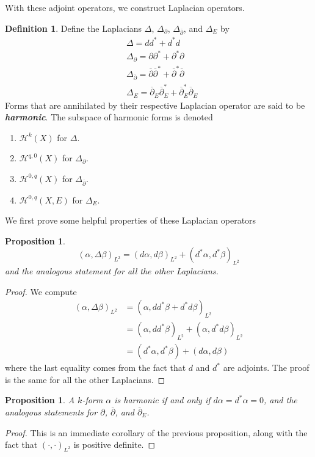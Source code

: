 \documentclass[psamsfonts, 12pt]{amsart}
\newtheorem{prop}[thm]{Proposition}
\theoremstyle{definition}
\newtheorem{defn}[thm]{Definition}
\theoremstyle{remark}
\newcommand{\ib}[1]{\textbf{\textit{#1}}}
\newcommand{\dbar}{\overline{\partial}}
\begin{document}
With these adjoint operators, we construct Laplacian operators.
%
\begin{defn}
Define the Laplacians $\Delta$, $\Delta_\partial$, $\Delta_{\dbar}$, and
$\Delta_E$ by
\begin{align*}
&\Delta = dd^* + d^*d \\
&\Delta_\partial = \partial\partial^* + \partial^*\partial \\
&\Delta_{\dbar} = \dbar\dbar^* + \dbar^*\dbar \\
&\Delta_E = \dbar_E\dbar_E^* + \dbar_E^*\dbar_E
\end{align*}
Forms that are annihilated by their respective Laplacian operator are said to be
\ib{harmonic}. The subspace of harmonic forms is denoted
\begin{enumerate}
  \item $\mathcal{H}^k(X)$ for $\Delta$.
  \item $\mathcal{H}^{q,0}(X)$ for $\Delta_\partial$.
  \item $\mathcal{H}^{0,q}(X)$ for $\Delta_{\dbar}$.
  \item $\mathcal{H}^{0,q}(X,E)$ for $\Delta_E$.
\end{enumerate}
\end{defn}
%
We first prove some helpful properties of these Laplacian operators
%
\begin{prop}
\[
(\alpha,\Delta\beta)_{L^2} = (d\alpha,d\beta)_{L^2} + (d^*\alpha,d^*\beta)_{L^2}
\]
and the analogous statement for all the other Laplacians.
\end{prop}
%
\begin{proof}
We compute
\begin{align*}
(\alpha,\Delta\beta)_{L^2} &= (\alpha, dd^*\beta + d^*d\beta)_{L^2} \\
&= (\alpha,dd^*\beta)_{L^2} + (\alpha,d^*d\beta)_{L^2} \\
&= (d^*\alpha,d^*\beta) + (d\alpha,d\beta)
\end{align*}
where the last equality comes from the fact that $d$ and $d^*$ are adjoints. The
proof is the same for all the other Laplacians.
\end{proof}
%
\begin{prop}
A $k$-form $\alpha$ is harmonic if and only if $d\alpha = d^*\alpha = 0$,
and the analogous statements for $\partial$, $\dbar$, and $\dbar_E$.
\end{prop}
%
\begin{proof}
This is an immediate corollary of the previous proposition, along with the fact that
$(\cdot,\cdot)_{L^2}$ is positive definite.
\end{proof}
\end{document}
